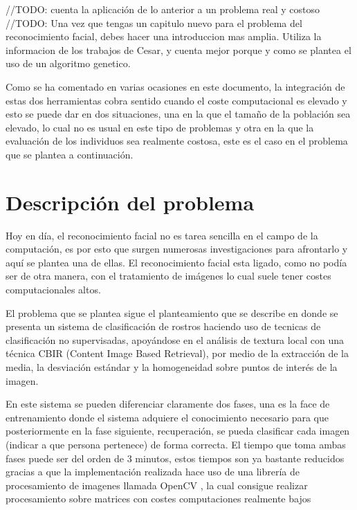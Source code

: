 \label{problema-facerecognition}
//TODO: cuenta la aplicación de lo anterior a un problema real y costoso
//TODO: Una vez que tengas un capitulo nuevo para el problema del reconocimiento facial, debes hacer una introduccion mas amplia. Utiliza la informacion de los trabajos de Cesar, y cuenta mejor porque y como se plantea el uso de un algoritmo genetico.

Como se ha comentado en varias ocasiones en este documento, la integración de estas dos herramientas cobra sentido cuando el coste computacional es elevado y esto se puede dar en dos situaciones, una en la que el tama\~no de la población sea elevado, lo cual no es usual en este tipo de problemas y otra en la que la evaluación de los individuos sea realmente costosa, este es el caso en el problema que se plantea a continuación.

\section{Descripci\'on del problema}

Hoy en d\'ia, el reconocimiento facial no es tarea sencilla en el campo de la computación, es por esto que surgen numerosas investigaciones para afrontarlo y aquí se plantea una de ellas. El reconocimiento facial esta ligado, como no podía ser de otra manera, con el tratamiento de imágenes lo cual suele tener costes computacionales altos.

El problema que se plantea sigue el planteamiento que se describe en \cite{paper-facerecognition} donde se presenta un sistema de clasificación de rostros haciendo uso de tecnicas de clasificaci\'on no supervisadas, apoy\'andose en el an\'alisis de textura local con una t\'ecnica CBIR (Content Image Based Retrieval), por medio de la extracci\'on de la media, la desviaci\'on est\'andar y la homogeneidad sobre puntos de inter\'es de la imagen.


En este sistema se pueden diferenciar claramente dos fases, una es la face de entrenamiento  donde el sistema adquiere el conocimiento necesario para que posteriormente en la fase siguiente, recuperación, se pueda clasificar cada imagen (indicar a que persona pertenece) de forma correcta. El tiempo que toma ambas fases puede ser del orden de 3 minutos, estos tiempos son ya bastante reducidos gracias a que la implementaci\'on realizada hace uso de una librería de procesamiento de imagenes llamada OpenCV \cite{opencv}, la cual consigue realizar procesamiento sobre matrices con costes computaciones realmente bajos